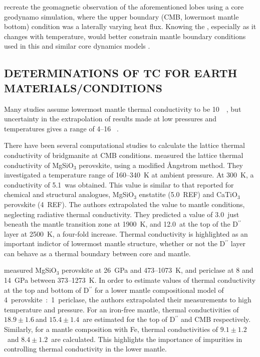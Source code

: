\citet{Gubbins2007} recreate the geomagnetic observation of the aforementioned lobes using a core geodynamo simulation, where the upper boundary (CMB, lowermost mantle bottom) condition was a laterally varying heat flux. Knowing the \tc, especially as it changes with temperature, would better constrain mantle boundary conditions used in this and similar core dynamics models \citep{Ammann2014}.




\subsection{DETERMINATIONS OF TC FOR EARTH MATERIALS/CONDITIONS}
Many studies assume lowermost mantle thermal conductivity to be 10~\wmk~\citep[e.g.][]{Lay2008}, but uncertainty in the extrapolation of results made at low pressures and temperatures gives a range of 4--16 \wmk~\citep{Brown1986, Osako1991, Hofmeister1999, Goncharov2009, Manthilake2011, Ohta2012}.

There have been several computational studies to calculate the lattice thermal conductivity of bridgmanite at CMB conditions. \citet{Osako1991} measured the lattice thermal conductivity of MgSiO$_3$ perovskite, using a modified \AA ngstrom method. They investigated a temperature range of 160--340~K at ambient pressure. At 300~K, a conductivity of 5.1~\wmk was obtained. This value is similar to that reported for chemical and structural analogues, MgSiO$_3$ enstatite (5.0~\wmk REF) and CaTiO$_{3}$ perovskite (4~\wmk REF). The authors extrapolated the value to mantle conditions, neglecting radiative thermal conductivity. They predicted a value of 3.0~\wmk just beneath the mantle transition zone at 1900~K, and 12.0~\wmks at the top of the D$^{\prime \prime}$ layer at 2500~K, a four-fold increase. Thermal conductivity is highlighted as an important indictor of lowermost mantle structure, whether or not the D$^{\prime \prime}$ layer can behave as a thermal boundary between core and mantle.

\citet{Manthilake2011} measured MgSiO$_3$ perovskite at 26~GPa and 473--1073~K, and periclase at 8 and 14~GPa between 373--1273~K. In order to estimate values of thermal conductivity at the top and bottom of D$^{\prime \prime}$ for a lower mantle compositional model of 4~perovskite~:~1~periclase, the authors extrapolated their measurements to high temperature and pressure. For an iron-free mantle, thermal conductivities of $18.9\pm1.6~$\wmk and $15.4\pm1.4$~\wmk are estimated for the top of D$^{\prime \prime}$ and CMB respectively. Similarly, for a mantle composition with Fe, thermal conductivities of $9.1\pm1.2$~\wmk and $8.4\pm1.2$~\wmk are calculated. This highlights the importance of impurities in controlling thermal conductivity in the lower mantle.

